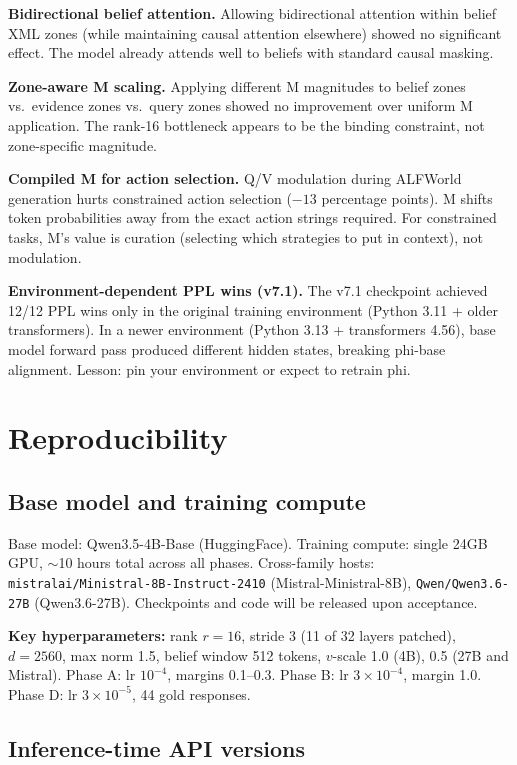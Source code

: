 \textbf{Bidirectional belief attention.} Allowing bidirectional attention within belief XML zones (while maintaining causal attention elsewhere) showed no significant effect. The model already attends well to beliefs with standard causal masking.

\textbf{Zone-aware M scaling.} Applying different M magnitudes to belief zones vs.\ evidence zones vs.\ query zones showed no improvement over uniform M application. The rank-16 bottleneck appears to be the binding constraint, not zone-specific magnitude.

\textbf{Compiled M for action selection.} Q/V modulation during ALFWorld generation hurts constrained action selection ($-13$ percentage points). M shifts token probabilities away from the exact action strings required. For constrained tasks, M's value is curation (selecting which strategies to put in context), not modulation.

\textbf{Environment-dependent PPL wins (v7.1).} The v7.1 checkpoint achieved 12/12 PPL wins only in the original training environment (Python 3.11 + older transformers). In a newer environment (Python 3.13 + transformers 4.56), base model forward pass produced different hidden states, breaking phi-base alignment. Lesson: pin your environment or expect to retrain phi.

\section{Reproducibility}
\label{sec:reproducibility}

\subsection{Base model and training compute}

Base model: Qwen3.5-4B-Base (HuggingFace). Training compute: single 24GB GPU, $\sim$10 hours total across all phases. Cross-family hosts: \texttt{mistralai/Ministral-8B-Instruct-2410} (Mistral-Ministral-8B), \texttt{Qwen/Qwen3.6-27B} (Qwen3.6-27B). Checkpoints and code will be released upon acceptance.

\textbf{Key hyperparameters:} rank $r = 16$, stride 3 (11 of 32 layers patched), $d = 2560$, max norm 1.5, belief window 512 tokens, $v$-scale 1.0 (4B), 0.5 (27B and Mistral). Phase A: lr $10^{-4}$, margins 0.1--0.3. Phase B: lr $3 \times 10^{-4}$, margin 1.0. Phase D: lr $3 \times 10^{-5}$, 44 gold responses.

\subsection{Inference-time API versions}


